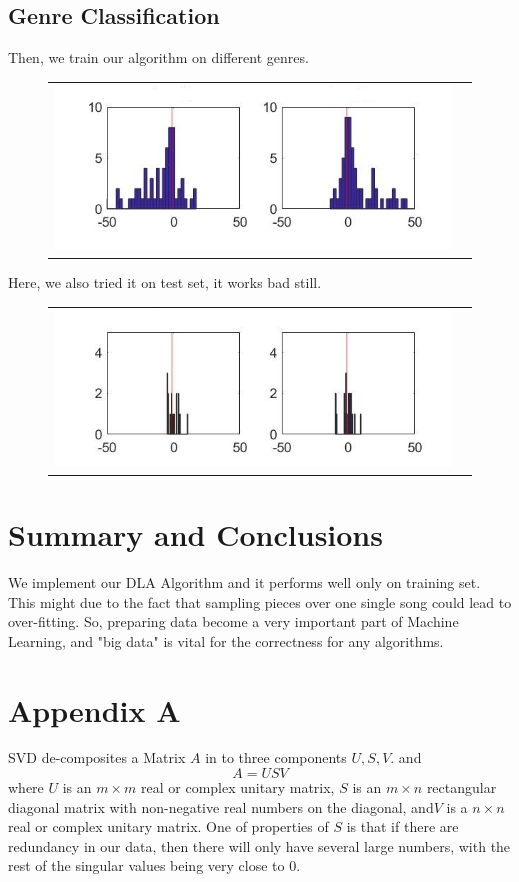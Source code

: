 \documentclass[12pt]{article}
\begin{document}
\subsection{Genre Classification}
Then, we train our algorithm on different genres.
\begin{figure}[H]
\begin{tabular}{cc}
  \includegraphics[width=\textwidth]{genre.jpg}
\end{tabular}
\end{figure}
Here, we also tried it on test set, it works bad still.
\begin{figure}[H]
\begin{tabular}{cc}
  \includegraphics[width=\textwidth]{genre_test.jpg}
\end{tabular}
\end{figure}
\section{Summary and Conclusions}
We implement our DLA Algorithm and it performs well only on training set. This might due to the fact that sampling pieces over one single song could lead to over-fitting. So, preparing data become a very important part of Machine Learning, and "big data" is vital for the correctness for any algorithms.
\section{Appendix A}
SVD de-composites a Matrix $A$ in to three components $U, S, V$. and
\[A = USV\]
where $U$  is an $ m\times m$ real or complex unitary matrix, $S$ is an $ m\times n$ rectangular diagonal matrix with non-negative real numbers on the diagonal, and$V$ is a $ n\times n$ real or complex unitary matrix.
One of properties of $S$ is that if there are redundancy in our data, then there will only have several large numbers, with the rest of the singular values being very close to 0.
\end{document}
